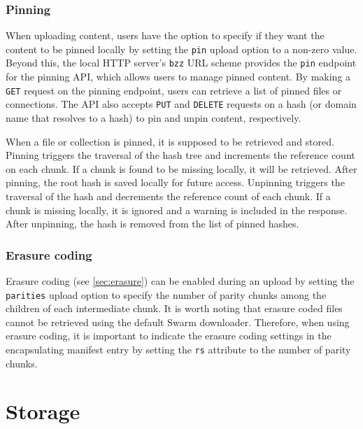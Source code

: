 \subsubsection{Pinning}

When uploading content, users have the option to specify if they want the content to be pinned locally by setting the \lstinline{pin} upload option to a non-zero value. Beyond this, the local HTTP server's \lstinline{bzz} URL scheme provides the \lstinline{pin} endpoint for the pinning API, which allows users to manage pinned content. By making a \lstinline{GET} request on the pinning endpoint, users can retrieve a list of pinned files or connections. The API also accepts \lstinline{PUT} and \lstinline{DELETE} requests on a hash (or domain name that resolves to a hash) to pin and unpin content, respectively.  

When a file or collection is pinned, it is supposed to be retrieved and stored. Pinning triggers the traversal of the hash tree and increments the reference count on each chunk. If a chunk is found to be missing locally, it will be retrieved. After pinning, the root hash is saved locally for future access. Unpinning triggers the traversal of the hash and decrements the reference count of each chunk. If a chunk is missing locally, it is ignored and a warning is included in the response. After unpinning, the hash is removed from the list of pinned hashes. 



\subsubsection{Erasure coding}

Erasure coding (see \ref{sec:erasure}) can be enabled during an upload by setting the \lstinline{parities} upload option to specify the number of parity chunks among the children of each intermediate chunk. It is worth noting that erasure coded files cannot be retrieved using the default Swarm downloader. Therefore, when using erasure coding, it is important to indicate the erasure coding settings in the encapsulating manifest entry by setting the \lstinline{rs} attribute to the number of parity chunks. 

\section{Storage \statusgreen}\label{sec:storage-ux}

\green{}


